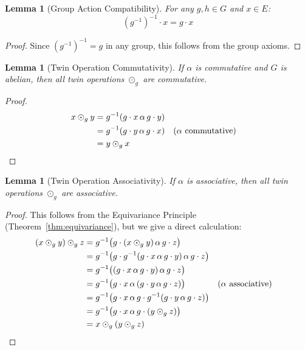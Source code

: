 \documentclass[11pt,a4paper,openany]{book}
\theoremstyle{plain}
\newtheorem{lemma}[theorem]{Lemma}
\theoremstyle{definition}
\newcommand{\twing}[1]{\odot_{#1}}
\newcommand{\actspace}{E}
\newcommand{\groupG}{G}
\begin{document}
\begin{lemma}[Group Action Compatibility]\label{lem:action-compat}
For any $g, h \in \groupG$ and $x \in \actspace$:
\[
(g^{-1})^{-1} \cdot x = g \cdot x
\]
\end{lemma}

\begin{proof}
Since $(g^{-1})^{-1} = g$ in any group, this follows from the group axioms.
\end{proof}

\begin{lemma}[Twin Operation Commutativity]\label{lem:twin-comm}
If $\alpha$ is commutative and $\groupG$ is abelian, then all twin operations $\twing{g}$ are commutative.
\end{lemma}

\begin{proof}
\begin{align*}
x \twing{g} y &= g^{-1}(g \cdot x \,\alpha\, g \cdot y) \\
&= g^{-1}(g \cdot y \,\alpha\, g \cdot x) && \text{($\alpha$ commutative)} \\
&= y \twing{g} x \qedhere
\end{align*}
\end{proof}

\begin{lemma}[Twin Operation Associativity]\label{lem:twin-assoc}
If $\alpha$ is associative, then all twin operations $\twing{g}$ are associative.
\end{lemma}

\begin{proof}
This follows from the Equivariance Principle (Theorem~\ref{thm:equivariance}), but we give a direct calculation:
\begin{align*}
(x \twing{g} y) \twing{g} z &= g^{-1}\big(g \cdot (x \twing{g} y) \,\alpha\, g \cdot z\big) \\
&= g^{-1}\big(g \cdot g^{-1}(g \cdot x \,\alpha\, g \cdot y) \,\alpha\, g \cdot z\big) \\
&= g^{-1}\big((g \cdot x \,\alpha\, g \cdot y) \,\alpha\, g \cdot z\big) \\
&= g^{-1}\big(g \cdot x \,\alpha\, (g \cdot y \,\alpha\, g \cdot z)\big) && \text{($\alpha$ associative)} \\
&= g^{-1}\big(g \cdot x \,\alpha\, g \cdot g^{-1}(g \cdot y \,\alpha\, g \cdot z)\big) \\
&= g^{-1}\big(g \cdot x \,\alpha\, g \cdot (y \twing{g} z)\big) \\
&= x \twing{g} (y \twing{g} z) \qedhere
\end{align*}
\end{proof}
\end{document}
